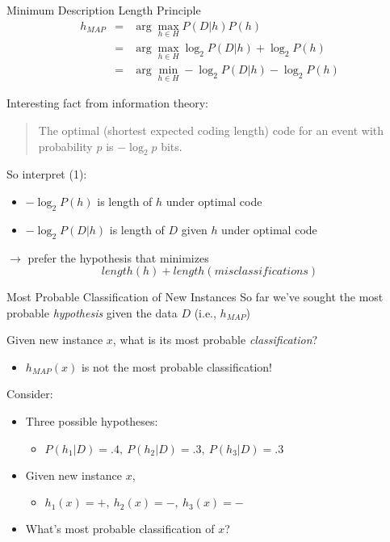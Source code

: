 \documentclass[%
pdf,
colorBG,
slideColor,
tcrico,
]{prosper}
\begin{document}
\begin{slide}{ Minimum Description Length Principle   }  
\tiny
\begin{eqnarray}
h_{MAP} &= &\arg \max_{h \in H}P(D|h) P(h) \nonumber \\
&= &\arg \max_{h \in H} \log_{2} P(D|h) + \log_{2} P(h)  \nonumber \\
&= &\arg \min_{h \in H} - \log_{2} P(D|h) - \log_{2} P(h) 
\end{eqnarray}

Interesting fact from information theory:
\begin{quote}
The optimal (shortest expected coding length) code for an event with
probability $p$ is $- \log_{2} p$ bits.
\end{quote}

So interpret (1):
\begin{itemize}
\item $- \log_{2} P(h)$ is length of $h$ under optimal code
\item $- \log_{2} P(D|h)$ is length of $D$ given $h$ under optimal code
\end{itemize}

$\rightarrow$ prefer the hypothesis that minimizes
\[ length(h) + length(misclassifications) \]
\end{slide}


\begin{slide}{\normalsize Most Probable Classification of New Instances   }  
\tiny
So far we've sought the most probable {\em hypothesis} given the data $D$
(i.e., $h_{MAP}$)

Given new instance $x$, what is its most probable {\em classification}?
\begin{itemize}
\item $h_{MAP}(x)$ is not the most probable classification!
\end{itemize}
Consider:
\begin{itemize}
\item Three possible hypotheses: 
\begin{itemize} \item[] $P(h_{1}|D)=.4, \  P(h_{2}|D)=.3, \  P(h_{3}|D)=.3$ \end{itemize}
\item Given new instance $x$, 
\begin{itemize} \item[] $h_{1}(x)=+, \ h_{2}(x)=-, \ h_{3}(x)=-$ \end{itemize}
\item What's most probable classification of $x$?
\end{itemize}
\end{slide}
\end{document}
